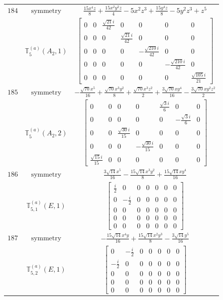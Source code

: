 \documentclass[fleqn,8pt,landscape]{jsarticle}
\begin{document}
\begin{longtable}{ccc}
$ 184 $ & $ \text{symmetry} $ & $ \frac{15 x^{4} z}{8} + \frac{15 x^{2} y^{2} z}{4} - 5 x^{2} z^{3} + \frac{15 y^{4} z}{8} - 5 y^{2} z^{3} + z^{5} $ \\
$  $ & $ \mathbb{T}_{5}^{(a)}(A_{2},1) $ & $ \begin{bmatrix} 0 & 0 & \frac{\sqrt{21} i}{42} & 0 & 0 & 0 & 0 \\ 0 & 0 & 0 & \frac{\sqrt{21} i}{42} & 0 & 0 & 0 \\ 0 & 0 & 0 & 0 & - \frac{\sqrt{210} i}{42} & 0 & 0 \\ 0 & 0 & 0 & 0 & 0 & - \frac{\sqrt{210} i}{42} & 0 \\ 0 & 0 & 0 & 0 & 0 & 0 & \frac{\sqrt{105} i}{21} \end{bmatrix} $ \\ \hline
$ 185 $ & $ \text{symmetry} $ & $ - \frac{\sqrt{70} x^{5}}{16} + \frac{\sqrt{70} x^{3} y^{2}}{8} + \frac{\sqrt{70} x^{3} z^{2}}{2} + \frac{3 \sqrt{70} x y^{4}}{16} - \frac{3 \sqrt{70} x y^{2} z^{2}}{2} $ \\
$  $ & $ \mathbb{T}_{5}^{(a)}(A_{2},2) $ & $ \begin{bmatrix} 0 & 0 & 0 & 0 & \frac{\sqrt{3} i}{6} & 0 & 0 \\ 0 & 0 & 0 & 0 & 0 & - \frac{\sqrt{3} i}{6} & 0 \\ 0 & 0 & \frac{\sqrt{30} i}{15} & 0 & 0 & 0 & 0 \\ 0 & 0 & 0 & - \frac{\sqrt{30} i}{15} & 0 & 0 & 0 \\ \frac{\sqrt{15} i}{15} & 0 & 0 & 0 & 0 & 0 & 0 \end{bmatrix} $ \\ \hline
$ 186 $ & $ \text{symmetry} $ & $ \frac{3 \sqrt{14} x^{5}}{16} - \frac{15 \sqrt{14} x^{3} y^{2}}{8} + \frac{15 \sqrt{14} x y^{4}}{16} $ \\
$  $ & $ \mathbb{T}_{5,1}^{(a)}(E,1) $ & $ \begin{bmatrix} \frac{i}{2} & 0 & 0 & 0 & 0 & 0 & 0 \\ 0 & - \frac{i}{2} & 0 & 0 & 0 & 0 & 0 \\ 0 & 0 & 0 & 0 & 0 & 0 & 0 \\ 0 & 0 & 0 & 0 & 0 & 0 & 0 \\ 0 & 0 & 0 & 0 & 0 & 0 & 0 \end{bmatrix} $ \\ \hline
$ 187 $ & $ \text{symmetry} $ & $ - \frac{15 \sqrt{14} x^{4} y}{16} + \frac{15 \sqrt{14} x^{2} y^{3}}{8} - \frac{3 \sqrt{14} y^{5}}{16} $ \\
$  $ & $ \mathbb{T}_{5,2}^{(a)}(E,1) $ & $ \begin{bmatrix} 0 & - \frac{i}{2} & 0 & 0 & 0 & 0 & 0 \\ - \frac{i}{2} & 0 & 0 & 0 & 0 & 0 & 0 \\ 0 & 0 & 0 & 0 & 0 & 0 & 0 \\ 0 & 0 & 0 & 0 & 0 & 0 & 0 \\ 0 & 0 & 0 & 0 & 0 & 0 & 0 \end{bmatrix} $ \\ \hline

\end{longtable}
\end{document}
